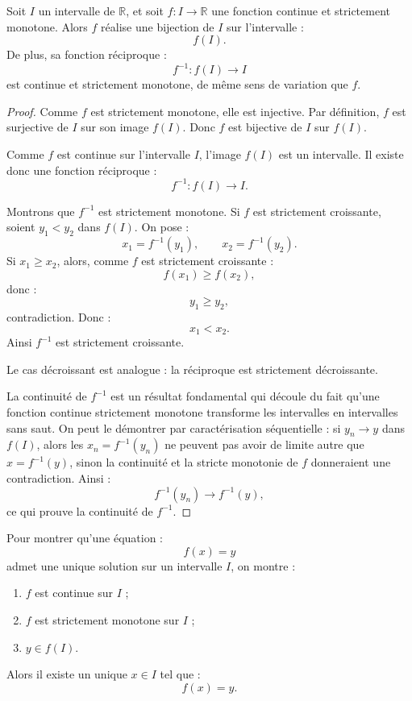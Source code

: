 \documentclass[11pt,a4paper]{article}
\newcommand{\R}{\mathbb R}
\begin{document}
\begin{theorembox}
Soit \(I\) un intervalle de \(\R\), et soit \(f:I\to\R\) une fonction continue et strictement monotone.  
Alors \(f\) réalise une bijection de \(I\) sur l'intervalle :
\[
f(I).
\]
De plus, sa fonction réciproque :
\[
f^{-1}:f(I)\to I
\]
est continue et strictement monotone, de même sens de variation que \(f\).
\end{theorembox}

\begin{proof}
Comme \(f\) est strictement monotone, elle est injective.  
Par définition, \(f\) est surjective de \(I\) sur son image \(f(I)\).  
Donc \(f\) est bijective de \(I\) sur \(f(I)\).

Comme \(f\) est continue sur l'intervalle \(I\), l'image \(f(I)\) est un intervalle.  
Il existe donc une fonction réciproque :
\[
f^{-1}:f(I)\to I.
\]

Montrons que \(f^{-1}\) est strictement monotone.  
Si \(f\) est strictement croissante, soient \(y_1<y_2\) dans \(f(I)\).  
On pose :
\[
x_1=f^{-1}(y_1),
\qquad
x_2=f^{-1}(y_2).
\]
Si \(x_1\geq x_2\), alors, comme \(f\) est strictement croissante :
\[
f(x_1)\geq f(x_2),
\]
donc :
\[
y_1\geq y_2,
\]
contradiction.  
Donc :
\[
x_1<x_2.
\]
Ainsi \(f^{-1}\) est strictement croissante.

Le cas décroissant est analogue : la réciproque est strictement décroissante.

La continuité de \(f^{-1}\) est un résultat fondamental qui découle du fait qu'une fonction continue strictement monotone transforme les intervalles en intervalles sans saut.  
On peut le démontrer par caractérisation séquentielle : si \(y_n\to y\) dans \(f(I)\), alors les \(x_n=f^{-1}(y_n)\) ne peuvent pas avoir de limite autre que \(x=f^{-1}(y)\), sinon la continuité et la stricte monotonie de \(f\) donneraient une contradiction.  
Ainsi :
\[
f^{-1}(y_n)\to f^{-1}(y),
\]
ce qui prouve la continuité de \(f^{-1}\).
\end{proof}

\begin{methodbox}
Pour montrer qu'une équation :
\[
f(x)=y
\]
admet une unique solution sur un intervalle \(I\), on montre :
\begin{enumerate}
    \item \(f\) est continue sur \(I\) ;
    \item \(f\) est strictement monotone sur \(I\) ;
    \item \(y\in f(I)\).
\end{enumerate}
Alors il existe un unique \(x\in I\) tel que :
\[
f(x)=y.
\]
\end{methodbox}
\end{document}
